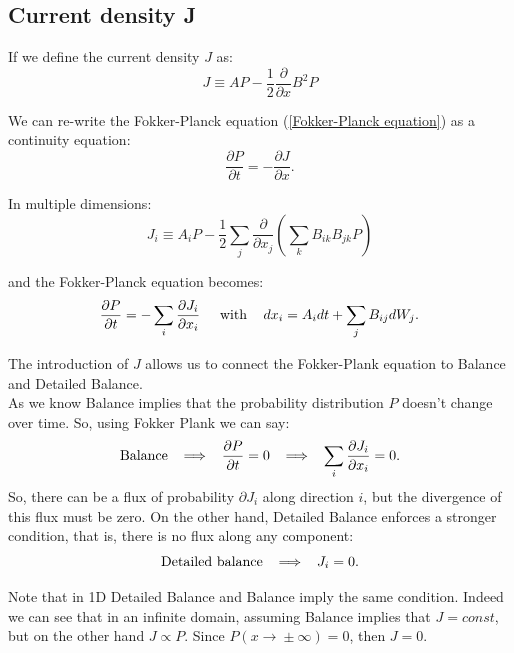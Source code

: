 \subsection{Current density J}
If we define the current density $J$ as:
\[
J \equiv AP - \frac{1}{2} \frac{\partial}{\partial x}B^2 P
\]

We can re-write the Fokker-Planck equation (\ref{Fokker-Planck equation}) as a continuity equation:
\begin{equation}
\frac{\partial P}{\partial t} = - \frac{\partial J}{\partial x}.
\label{K-P continuity equation}
\end{equation}

In multiple dimensions:
\[
J_i \equiv A_iP - \frac{1}{2}\sum_j \frac{\partial}{\partial x_j} \left( \sum_k B_{ik}B_{jk} P \right)
\]

and the Fokker-Planck equation becomes:
\begin{equation}
\frac{\partial P}{\partial t} = - \sum_i \frac{\partial J_i}{\partial x_i} \hspace{5mm}\text{with }\hspace{3mm} dx_i = A_idt + \sum_j B_{ij} dW_j.
\label{K-P multidimentonal continuity equation}
\end{equation}


The introduction of $J$ allows us to connect the Fokker-Plank equation to Balance and Detailed Balance. \\
As we know Balance implies that the probability distribution $P$ doesn't change over time. So, using Fokker Plank we can say:
\[
\text{Balance} \hspace{2mm} \implies \hspace{2mm} \frac{\partial P}{\partial t} = 0 \hspace{2mm} \implies \hspace{2mm} \sum_i \frac{\partial J_i}{\partial x_i} = 0.
\]
So, there can be a flux of probability $\partial J_i$ along direction $i$, but the divergence of this flux must be zero. On the other hand, Detailed Balance enforces a stronger condition, that is, there is no flux along any component:
\[
\text{Detailed balance} \hspace{2mm} \implies \hspace{2mm} J_i = 0.
\]

Note that in 1D Detailed Balance and Balance imply the same condition. Indeed we can see that in an infinite domain, assuming Balance implies that $J=const$, but on the other hand $J\propto P$. Since $P(x\xrightarrow{}\pm \infty) = 0$, then $J = 0$. \\

